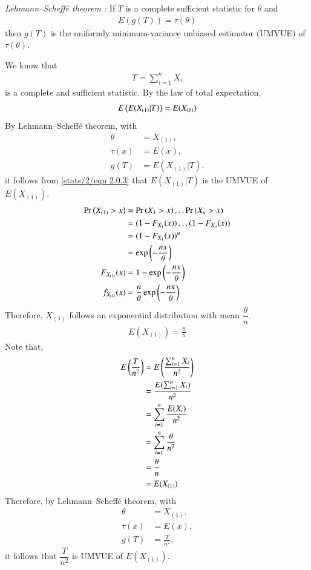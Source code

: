 \begin{lemma}
    {\em Lehmann–Scheffé theorem :} If $T$ is a complete sufficient statistic for $\theta$ and 
    \begin{align}
    \label{stats/2/eqn 2.0.1}
    E(g(T)) = \tau(\theta)
    \end{align}
    then $g(T)$ is the uniformly minimum-variance unbiased estimator (UMVUE) of $\tau(\theta)$.
    
\end{lemma}




We know that 
\begin{align}
T = \sum_{i=1}^{n} X_i
\end{align}
is a complete and sufficient statistic. By the law of total expectation, 
\begin{align}
\label{stats/2/eqn 2.0.3}
E\left(E(X_{(1)} | T )\right) = E(X_{(1)})
\end{align}
By Lehmann–Scheffé theorem, with
\begin{align}
\theta &= X_{(1)},\\ 
\tau(x) &= E(x),\\
g(T) &= E(X_{(1)} | T).
\end{align}
it follows from \eqref{stats/2/eqn 2.0.3} that $E(X_{(1)} | T)$ is the UMVUE of $E(X_{(1)})$.
\begin{align}
\Pr\left(X_{(1)} > x\right) &= \Pr\left(X_1 > x\right)\ldots \Pr\left(X_n > x\right)\\
&= (1-F_{X_{1}}(x))\ldots(1-F_{X_{n}}(x))\\
&= (1-F_{X_{1}}(x))^n \\
&= \exp\left(-\frac{nx}{\theta}\right)\\
F_{X_{(1)}}(x) &= 1 - \exp\left(-\frac{nx}{\theta}\right)\\
f_{X_{(1)}}(x) &= \frac{n}{\theta} \exp\left(-\frac{nx}{\theta}\right)
\end{align}
Therefore, $X_{(1)}$ follows an exponential distribution with mean $\dfrac{\theta}{n}$.
\begin{align}
E(X_{(1)}) = \frac{\theta}{n}
\end{align}
Note that,
\begin{align}
E\left(\frac{T}{n^2}\right) &= E\left(\frac{\sum_{i=1}^n X_i}{n^2}\right)\\
&= \frac{E(\sum_{i=1}^n X_i)}{n^2}\\
&= \sum_{i=1}^n \frac{E(X_i)}{n^2}\\
&= \sum_{i=1}^n \frac{\theta}{n^2}\\
&= \frac{\theta}{n}\\
&= E(X_{(1)})
\end{align}
Therefore, by Lehmann–Scheffé theorem, with
\begin{align}
\theta &= X_{(1)},\\
\tau(x) &= E(x),\\
g(T) &= \frac{T}{n^2},
\end{align}
it follows that $\dfrac{T}{n^2}$ is UMVUE of $E(X_{(1)})$.\\

